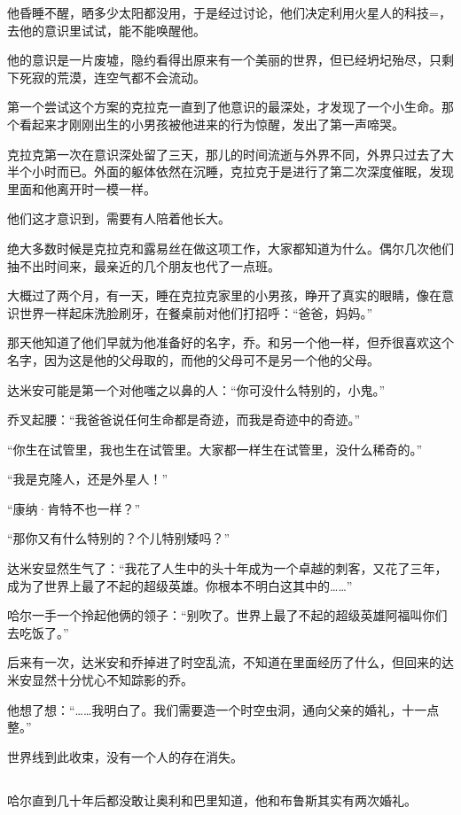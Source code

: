 \documentclass[../main]{subfiles}
\begin{document}
他昏睡不醒，晒多少太阳都没用，于是经过讨论，他们决定利用火星人的科技=，去他的意识里试试，能不能唤醒他。

他的意识是一片废墟，隐约看得出原来有一个美丽的世界，但已经坍圮殆尽，只剩下死寂的荒漠，连空气都不会流动。

第一个尝试这个方案的克拉克一直到了他意识的最深处，才发现了一个小生命。那个看起来才刚刚出生的小男孩被他进来的行为惊醒，发出了第一声啼哭。

克拉克第一次在意识深处留了三天，那儿的时间流逝与外界不同，外界只过去了大半个小时而已。外面的躯体依然在沉睡，克拉克于是进行了第二次深度催眠，发现里面和他离开时一模一样。

他们这才意识到，需要有人陪着他长大。

绝大多数时候是克拉克和露易丝在做这项工作，大家都知道为什么。偶尔几次他们抽不出时间来，最亲近的几个朋友也代了一点班。

大概过了两个月，有一天，睡在克拉克家里的小男孩，睁开了真实的眼睛，像在意识世界一样起床洗脸刷牙，在餐桌前对他们打招呼：“爸爸，妈妈。”

那天他知道了他们早就为他准备好的名字，乔。和另一个他一样，但乔很喜欢这个名字，因为这是他的父母取的，而他的父母可不是另一个他的父母。

达米安可能是第一个对他嗤之以鼻的人：“你可没什么特别的，小鬼。”

乔叉起腰：“我爸爸说任何生命都是奇迹，而我是奇迹中的奇迹。”

“你生在试管里，我也生在试管里。大家都一样生在试管里，没什么稀奇的。”

“我是克隆人，还是外星人！”

“康纳·肯特不也一样？”

“那你又有什么特别的？个儿特别矮吗？”

达米安显然生气了：“我花了人生中的头十年成为一个卓越的刺客，又花了三年，成为了世界上最了不起的超级英雄。你根本不明白这其中的……”

哈尔一手一个拎起他俩的领子：“别吹了。世界上最了不起的超级英雄阿福叫你们去吃饭了。”

后来有一次，达米安和乔掉进了时空乱流，不知道在里面经历了什么，但回来的达米安显然十分忧心不知踪影的乔。

他想了想：“……我明白了。我们需要造一个时空虫洞，通向父亲的婚礼，十一点整。”

世界线到此收束，没有一个人的存在消失。

\subsection{}

哈尔直到几十年后都没敢让奥利和巴里知道，他和布鲁斯其实有两次婚礼。

\storyend[全文完]
\end{document}
